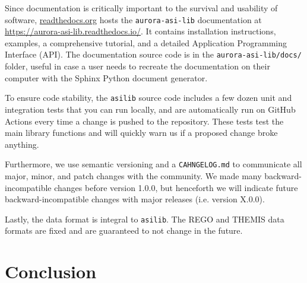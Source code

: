 \documentclass[draft]{agujournal2019}
\begin{document}
Since documentation is critically important to the survival and usability of software, \url{readthedocs.org} hosts the \verb|aurora-asi-lib| documentation at \url{https://aurora-asi-lib.readthedocs.io/}. It contains installation instructions, examples, a comprehensive tutorial, and a detailed Application Programming Interface (API). The documentation source code is in the \verb|aurora-asi-lib/docs/| folder, useful in case a user needs to recreate the documentation on their computer with the Sphinx Python document generator.

To ensure code stability, the \verb|asilib| source code includes a few dozen unit and integration tests that you can run locally, and are automatically run on GitHub Actions every time a change is pushed to the repository. These tests test the main library functions and will quickly warn us if a proposed change broke anything.

Furthermore, we use semantic versioning and a \verb|CAHNGELOG.md| to communicate all major, minor, and patch changes with the community. We made many backward-incompatible changes before version 1.0.0, but henceforth we will indicate future backward-incompatible changes with major releases (i.e. version X.0.0). 

Lastly, the data format is integral to \verb|asilib|. The REGO and THEMIS data formats are fixed and are guaranteed to not change in the future.


\section{Conclusion}
\end{document}
